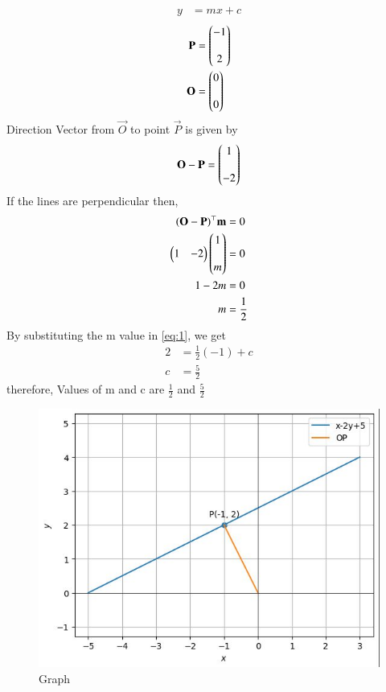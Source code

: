 \begin{align}
   y&=mx+c
 \label{eq:1}
 \end{align}
\begin{align}
  \mathbf{P}&=\begin{pmatrix}-1\\ \\2\end{pmatrix}\\
 \mathbf{O} &=\begin{pmatrix}0\\ \\ 0\end{pmatrix}
\end{align}
   Direction Vector from $\vec{O}$ to point $\vec{P}$ is given by
    \begin{align}
    \mathbf{O - P} =\begin{pmatrix}1\\ \\ -2\end{pmatrix}
 \end{align}
 If the lines are perpendicular then,
 \begin{align}
   \mathbf{(O - P)}^{\top}\mathbf{m} &= 0\\
   \begin{pmatrix}1 & -2\end{pmatrix}\begin{pmatrix}1 \\ \\ m\end{pmatrix}&=0\\
   1 - 2m &= 0\\
   m &= \frac{1}{2}
\end{align}
By substituting the m value in \eqref{eq:1},  we get
 \begin{align}
 2 &=\frac{1}{2} (-1) + c \\
 c &=\frac{5}{2}  
\end{align}
therefore,  Values of m and c are $\frac{1}{2}$ and $\frac{5}{2}$ \\
\begin{figure}[H]
  \centering
  \includegraphics[width=\columnwidth]{figs/graph.jpg}
  \caption{Graph}
  \label{fig:pic}
\end{figure}
%
